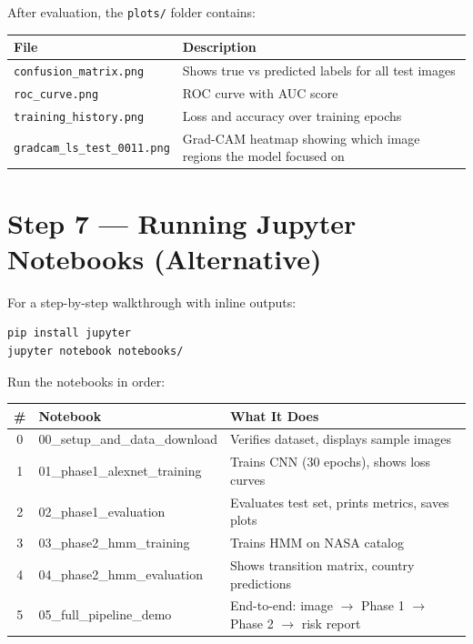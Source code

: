 \documentclass[11pt]{article}
\begin{document}
After evaluation, the \texttt{plots/} folder contains:

\begin{table}[H]
    \centering
    \renewcommand{\arraystretch}{1.2}
    \begin{tabular}{lp{9cm}}
        \toprule
        \textbf{File} & \textbf{Description} \\
        \midrule
        \texttt{confusion\_matrix.png} & Shows true vs predicted labels for all test images \\
        \texttt{roc\_curve.png} & ROC curve with AUC score \\
        \texttt{training\_history.png} & Loss and accuracy over training epochs \\
        \texttt{gradcam\_ls\_test\_0011.png} & Grad-CAM heatmap showing which image regions the model focused on \\
        \bottomrule
    \end{tabular}
\end{table}

\section{Step 7 --- Running Jupyter Notebooks (Alternative)}

For a step-by-step walkthrough with inline outputs:

\begin{verbatim}
pip install jupyter
jupyter notebook notebooks/
\end{verbatim}

Run the notebooks in order:

\begin{table}[H]
    \centering
    \renewcommand{\arraystretch}{1.3}
    \begin{tabular}{clp{8cm}}
        \toprule
        \textbf{\#} & \textbf{Notebook} & \textbf{What It Does} \\
        \midrule
        0 & 00\_setup\_and\_data\_download & Verifies dataset, displays sample images \\
        1 & 01\_phase1\_alexnet\_training & Trains CNN (30 epochs), shows loss curves \\
        2 & 02\_phase1\_evaluation & Evaluates test set, prints metrics, saves plots \\
        3 & 03\_phase2\_hmm\_training & Trains HMM on NASA catalog \\
        4 & 04\_phase2\_hmm\_evaluation & Shows transition matrix, country predictions \\
        5 & 05\_full\_pipeline\_demo & End-to-end: image $\to$ Phase 1 $\to$ Phase 2 $\to$ risk report \\
        \bottomrule
    \end{tabular}
\end{table}
\end{document}
